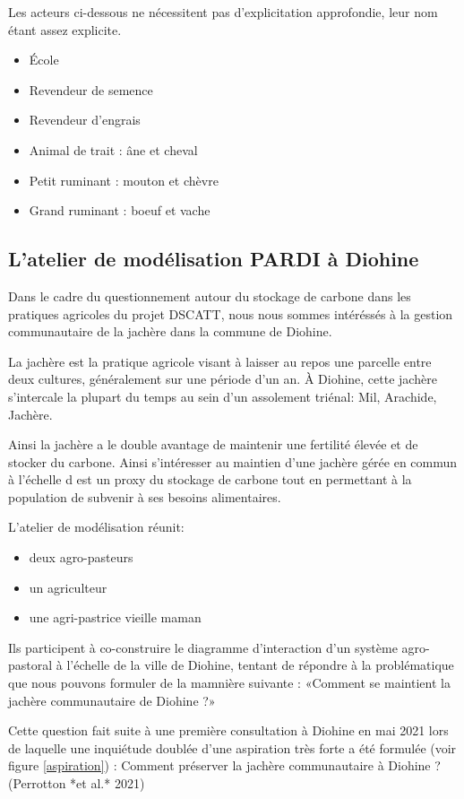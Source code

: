 Les acteurs ci-dessous ne nécessitent pas d'explicitation approfondie, leur nom étant assez explicite.

\begin{itemize}
\item École
\item Revendeur de semence
\item Revendeur d'engrais
\item Animal de trait : âne et cheval
\item Petit ruminant : mouton et chèvre
\item Grand ruminant : boeuf et vache
\end{itemize}

\subsection{L'atelier de modélisation PARDI à Diohine }

Dans le cadre du questionnement autour du stockage de carbone dans les pratiques agricoles du projet DSCATT, nous nous sommes intéréssés à la gestion communautaire de la jachère dans la commune de Diohine.

La jachère est la pratique agricole visant à laisser au repos une parcelle entre deux cultures, généralement sur une période d'un an. À Diohine, cette jachère s'intercale la plupart du temps au sein d'un assolement triénal: Mil, Arachide, Jachère.

Ainsi la jachère a le double avantage de maintenir une fertilité élevée et de stocker du carbone. Ainsi s'intéresser au maintien d'une jachère gérée en commun à l'échelle d est un proxy du stockage de carbone tout en permettant à la population de subvenir à ses besoins alimentaires.

L'atelier de modélisation réunit:
\begin{itemize}
  \item deux agro-pasteurs
  \item un agriculteur
  \item une agri-pastrice vieille maman
\end{itemize}

Ils participent à co-construire le diagramme d'interaction d'un système agro-pastoral à l'échelle de la ville de Diohine, tentant de répondre à la problématique que nous pouvons formuler de la mamnière suivante : «Comment se maintient la jachère communautaire de Diohine ?»

Cette question fait suite à une première consultation à Diohine en mai 2021 lors de laquelle une inquiétude doublée d'une aspiration très forte a été formulée (voir figure \ref{aspiration}) : Comment préserver la jachère communautaire à Diohine ? (Perrotton *et al.* 2021)

